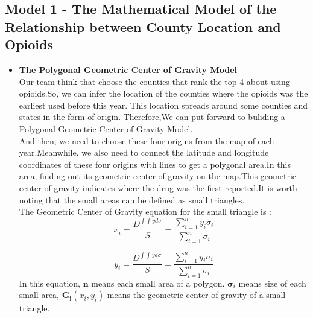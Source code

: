 \documentclass{mcmthesis}
\begin{document}
\subsection{Model 1 - The Mathematical Model of the Relationship between County Location and Opioids} %
\begin{itemize}
 \item \textbf{The Polygonal Geometric Center of Gravity Model} \\%
  Our team think that choose the counties that rank the top 4 about using opioids.So, we can infer the location of the counties where the opioids was the earliest used before this year. This location spreads around some counties and states in the form of origin. Therefore,We can put forward to buliding a Polygonal Geometric Center of Gravity Model.\\
 
 And then, we need to choose these four origins from the map of each year.Meanwhile, we also need to connect the latitude and longitude coordinates of these four origins with lines to get a polygonal area.In this area, finding out its geometric center of gravity on the map.This geometric center of gravity indicates where the drug was the first reported.It is worth noting that the small areas can be defined as small triangles.\\
 
 The Geometric Center of Gravity equation for the small triangle is  :\\

\begin{equation}
{x_i} = \frac{{{D^{\mathop \int\!\!\!\int \nolimits_{}^{} yd\sigma }}}}{S} = \frac{{\sum\limits_{i = 1}^n {{y_i}{\sigma _i}} }}{{\sum\limits_{i = 1}^n {{\sigma _i}} }}
\end{equation}
 
\begin{equation}
{y_i} = \frac{{{D^{\mathop \int\!\!\!\int \nolimits_{}^{} yd\sigma }}}}{S} = \frac{{\sum\limits_{i = 1}^n {{y_i}{\sigma _i}} }}{{\sum\limits_{i = 1}^n {{\sigma _i}} }}
\end{equation}
  In this equation,
  $\bm n$ means each small area of a polygon. $\bm \sigma_i $ means size of each small area, $\bm {G_i}({x_i},{y_i})$ means the geometric center of gravity of a small triangle.  \\


\end{itemize}
\end{document}
